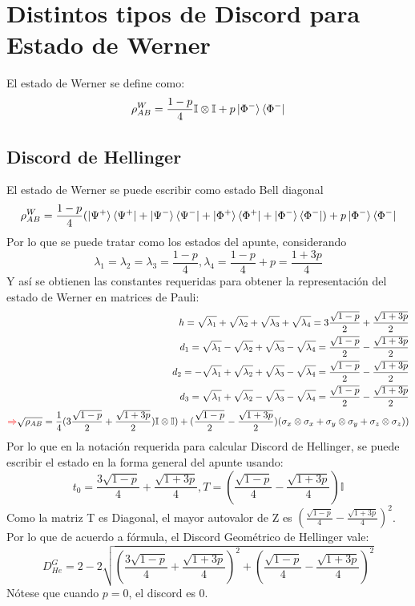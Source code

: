 \documentclass{book}
\begin{document}
\section{Distintos tipos de Discord para Estado de Werner}
El estado de Werner se define como:
\begin{equation}\label{eq2.150}\rho_{AB}^W=\frac{1-p}{4}\mathbb{I}\otimes\mathbb{I}+p\ket{\Phi^-}\bra{\Phi^-}\end{equation}
\subsection{Discord de Hellinger}
El estado de Werner se puede escribir como estado Bell diagonal
\begin{equation}\label{eq2.151}\rho_{AB}^W=\frac{1-p}{4}(\ket{\Psi^+}\bra{\Psi^+}+\ket{\Psi^-}\bra{\Psi^-}+\ket{\Phi^+}\bra{\Phi^+}+\ket{\Phi^-}\bra{\Phi^-})+p\ket{\Phi^-}\bra{\Phi^-}\end{equation}
Por lo que se puede tratar como los estados del apunte, considerando
\begin{equation}\label{eq2.152}\lambda_1=\lambda_2=\lambda_3=\frac{1-p}{4}, \lambda_4=\frac{1-p}{4}+p=\frac{1+3p}{4}\end{equation}
Y así se obtienen las constantes requeridas para obtener la representación del estado de Werner en matrices de Pauli:
\begin{equation}\label{eq2.153}\begin{aligned} h=\sqrt{\lambda_1}+\sqrt{\lambda_2}+\sqrt{\lambda_3}+\sqrt{\lambda_4}=3\frac{\sqrt{1-p}}{2}+\frac{\sqrt{1+3p}}{2}\\ d_1=\sqrt{\lambda_1}-\sqrt{\lambda_2}+\sqrt{\lambda_3}-\sqrt{\lambda_4}=\frac{\sqrt{1-p}}{2}-\frac{\sqrt{1+3p}}{2}\\ d_2=-\sqrt{\lambda_1}+\sqrt{\lambda_2}+\sqrt{\lambda_3}-\sqrt{\lambda_4}=\frac{\sqrt{1-p}}{2}-\frac{\sqrt{1+3p}}{2}\\ d_3=\sqrt{\lambda_1}+\sqrt{\lambda_2}-\sqrt{\lambda_3}-\sqrt{\lambda_4}=\frac{\sqrt{1-p}}{2}-\frac{\sqrt{1+3p}}{2}\\ \textcolor{red}{\Rightarrow} \sqrt{\rho_{AB}}= \frac{1}{4}(3\frac{\sqrt{1-p}}{2}+\frac{\sqrt{1+3p}}{2})\mathbb{I}\otimes\mathbb{I})+(\frac{\sqrt{1-p}}{2}-\frac{\sqrt{1+3p}}{2})(\sigma_x\otimes\sigma_x+\sigma_y\otimes\sigma_y+\sigma_z\otimes\sigma_z))\end{aligned}\end{equation}
Por lo que en la notación requerida para calcular Discord de Hellinger, se puede escribir el estado en la forma general del apunte usando:
\begin{equation}\label{eq2.154}t_0=\frac{3\sqrt{1-p}}{4}+\frac{\sqrt{1+3p}}{4}, T=(\frac{\sqrt{1-p}}{4}-\frac{\sqrt{1+3p}}{4})\mathbb{I}\end{equation}
Como la matriz T es Diagonal, el mayor autovalor de Z es $(\frac{\sqrt{1-p}}{4}-\frac{\sqrt{1+3p}}{4})^2$. Por lo que de acuerdo a fórmula, el Discord Geométrico de Hellinger vale:
\begin{equation}\label{eq2.155}D_{He}^G=2-2\sqrt{(\frac{3\sqrt{1-p}}{4}+\frac{\sqrt{1+3p}}{4})^2+(\frac{\sqrt{1-p}}{4}-\frac{\sqrt{1+3p}}{4})^2}\end{equation}
Nótese que cuando $p=0$, el discord es $0$.
\end{document}
